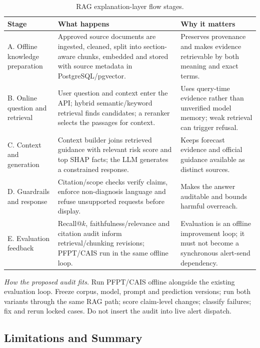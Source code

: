 \documentclass[10pt,openany]{report}
\begin{document}
\begin{table}[htbp]
\centering
\caption{RAG explanation-layer flow stages.}
\label{tab:rag-flow}
\small
\begin{tabular}{@{}>{\raggedright\arraybackslash}p{3.2cm}
                >{\raggedright\arraybackslash}p{5.8cm}
                >{\raggedright\arraybackslash}p{5.0cm}@{}}
\toprule
\textbf{Stage} & \textbf{What happens} & \textbf{Why it matters} \\
\midrule
A. Offline knowledge preparation &
Approved source documents are ingested, cleaned, split into section-aware chunks, embedded and stored with source metadata in PostgreSQL/pgvector. &
Preserves provenance and makes evidence retrievable by both meaning and exact terms. \\
B. Online question and retrieval &
User question and context enter the API; hybrid semantic/keyword retrieval finds candidates; a reranker selects the passages for context. &
Uses query-time evidence rather than unverified model memory; weak retrieval can trigger refusal. \\
C. Context and generation &
Context builder joins retrieved guidance with relevant risk score and top SHAP facts; the LLM generates a constrained response. &
Keeps forecast evidence and official guidance available as distinct sources. \\
D. Guardrails and response &
Citation/scope checks verify claims, enforce non-diagnosis language and refuse unsupported requests before display. &
Makes the answer auditable and bounds harmful overreach. \\
E. Evaluation feedback &
Recall@$k$, faithfulness/relevance and citation audit inform retrieval/chunking revisions; PFPT/CAIS run in the same offline loop. &
Evaluation is an offline improvement loop; it must not become a synchronous alert-send dependency. \\
\bottomrule
\end{tabular}
\end{table}

\noindent\textit{How the proposed audit fits.} Run PFPT/CAIS offline alongside the existing evaluation
loop. Freeze corpus, model, prompt and prediction versions; run both variants through the same RAG
path; score claim-level changes; classify failures; fix and rerun locked cases. Do not insert the
audit into live alert dispatch.

\subsection{Limitations and Summary}
\end{document}
